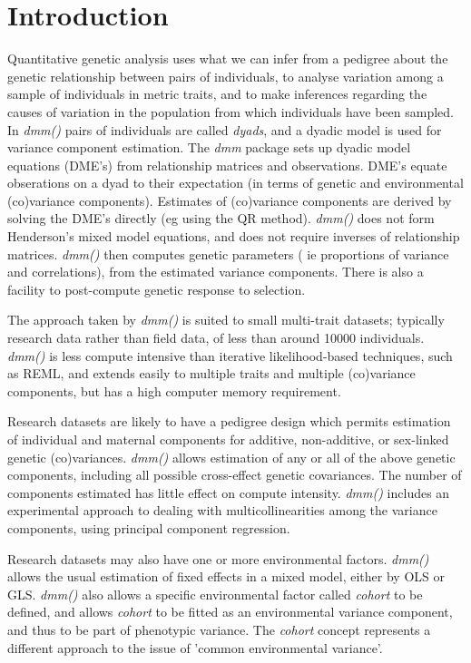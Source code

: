 \documentclass[titlepage]{article}  %
\begin{document}
\section{Introduction} 
 Quantitative genetic analysis uses what we can infer from a pedigree about the genetic relationship between pairs of individuals, to analyse variation among a sample of individuals in metric traits, and to make inferences regarding the causes of variation in the population from which individuals have been sampled. In {\em dmm()} pairs of individuals are called {\em dyads}, and a dyadic model is used for variance component estimation. The {\em dmm} package sets up dyadic model equations (DME's) from relationship matrices and observations. DME's equate obserations on a dyad to their expectation (in terms of genetic and environmental (co)variance components). Estimates of (co)variance components are derived by solving the DME's directly (eg using the QR method). {\em dmm()} does not form Henderson's mixed model equations, and does not require inverses of relationship matrices. {\em dmm()} then computes genetic parameters ( ie proportions of variance and correlations), from the estimated variance components. There is also a facility to post-compute genetic response to selection.

 The approach taken by {\em dmm()} is suited to small multi-trait datasets; typically research data rather than field data, of less than around 10000 individuals. {\em dmm()} is less compute intensive than iterative likelihood-based techniques, such as REML, and extends easily to multiple traits and multiple (co)variance components, but has a high computer memory requirement.

 Research datasets are likely to have a pedigree design which permits estimation of individual and maternal components for additive, non-additive, or sex-linked genetic (co)variances. {\em dmm()}  allows estimation of any or all of the above genetic components, including all possible cross-effect genetic covariances. The number of components estimated has little effect on compute intensity. {\em dmm()} includes an experimental approach to dealing with multicollinearities among the variance components, using principal component regression.

 Research datasets may also have one or more environmental factors. {\em dmm()} allows the usual estimation of fixed effects in a mixed model, either by OLS or GLS. {\em dmm()} also allows a specific environmental factor called {\em cohort} to be defined, and allows {\em cohort} to be fitted as an environmental variance component, and thus to be part of phenotypic variance. The {\em cohort} concept represents a different approach to the issue of 'common environmental variance'. 
\end{document}
